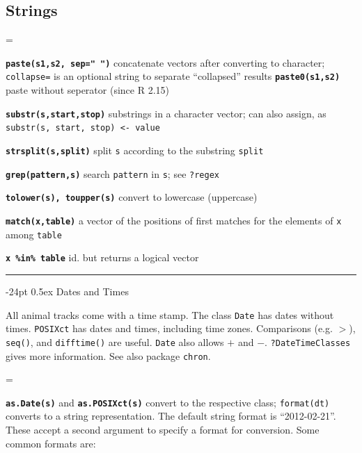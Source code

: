 \documentclass[8pt,landscape]{article}
\makeatletter
\renewcommand\section{\@startsection{section}{1}{0mm}%
                                     {-24pt}%
                                     {0.5ex}%
                                {\color{blue}\normalfont\large\bfseries}}
\newcommand{\code}{\texttt}
\newcommand{\bcode}[1]{\texttt{\textbf{#1}}}
\makeatother
\begin{document}
\begin{multicols*}{3}
     
\subsection{Strings}
\everypar={\hangindent=9mm}

\bcode{paste(s1,s2, sep=" ")} concatenate vectors after converting to character; 
\code{collapse=} is an optional string to separate ``collapsed'' results
\bcode{paste0(s1,s2)} paste without seperator (since R 2.15)

\bcode{substr(s,start,stop)} substrings in a character vector; can also assign, as \code{substr(s, start, stop) <- value}

\bcode{strsplit(s,split)} split \code{s} according to the substring \code{split}

\bcode{grep(pattern,s)} search \code{pattern} in \code{s}; see \code{?regex}


\bcode{tolower(s), toupper(s)} convert to lowercase (uppercase)

\bcode{match(x,table)} a vector of the positions of first matches for the elements of \code{x} among \code{table}

\bcode{x \%in\% table} id. but returns a logical vector 



\bigskip

\rule{.3\textwidth}{0.4pt}

\section{Dates and Times}

All animal tracks come with a time stamp. The class \code{Date} has dates without times.  \code{POSIXct} has
dates and times, including time zones. Comparisons (e.g. $>$),
\code{seq()}, and \code{difftime()} are useful. \code{Date} also allows
$+$ and $-$. \code{?DateTimeClasses} gives more information. See also package
\code{chron}.

 \bigskip

\everypar={\hangindent=9mm}

\bcode{as.Date(s)} and \bcode{as.POSIXct(s)} convert to the respective
class; \code{format(dt)} converts to a string representation. The
default string format is ``2012-02-21''. These accept a second argument
to specify a format for conversion. Some common formats are:


\end{multicols*}
\end{document}
